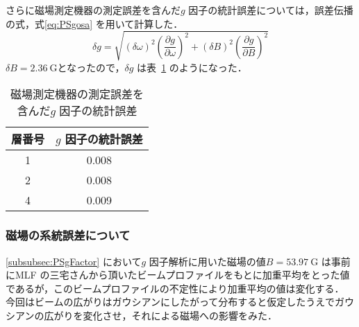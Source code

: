 さらに磁場測定機器の測定誤差を含んだ$g$ 因子の統計誤差については，誤差伝播の式，式\eqref{eq:PSgosa} を用いて計算した．
\begin{equation}
\delta g = \sqrt{\left(\delta\omega\right)^{2}\left(\frac{\partial g}{\partial\omega}\right)^{2} + \left(\delta B\right)^{2}\left(\frac{\partial g}{\partial B}\right)^{2}}
\label{eq:PSgosa}
\end{equation}%
$\delta B = 2.36~\mathrm{G}$となったので，$\delta g$ は表~\ref{tab:PSgStatErr} のようになった．
\begin{table}
	\centering
	\caption{磁場測定機器の測定誤差を含んだ$g$ 因子の統計誤差}
	\begin{tabular}{cc}\toprule
	層番号 & $g$ 因子の統計誤差\\ \midrule
	1 & 0.008 \\ 
	2 & 0.008 \\
	4 & 0.009 \\ \bottomrule
	\end{tabular}\label{tab:PSgStatErr}
\end{table}%

\subsubsection{磁場の系統誤差について}
\label{subsubsec:MagSysErr}

\ref{subsubsec:PSgFactor} において$g$ 因子解析に用いた磁場の値$B = 53.97~\mathrm{G}$ は事前にMLF の三宅さんから頂いたビームプロファイルをもとに加重平均をとった値であるが，このビームプロファイルの不定性により加重平均の値は変化する．
今回はビームの広がりはガウシアンにしたがって分布すると仮定したうえでガウシアンの広がりを変化させ，それによる磁場への影響をみた．

